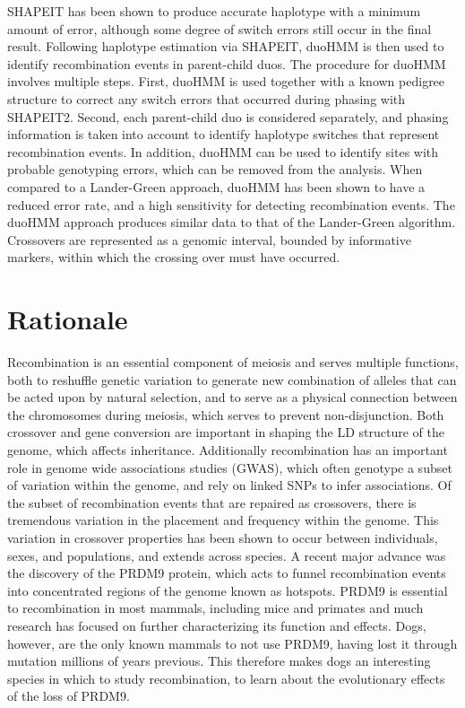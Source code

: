 SHAPEIT has been shown to produce accurate haplotype with a minimum amount of error, although some degree of switch errors still occur in the final result.
Following haplotype estimation via SHAPEIT, duoHMM\cite{OConnell2014} is then used to identify recombination events in parent-child duos.
The procedure for duoHMM involves multiple steps.
First, duoHMM is used together with a known pedigree structure to correct any switch errors that occurred during phasing with SHAPEIT2.
Second, each parent-child duo is considered separately, and phasing information is taken into account to identify haplotype switches that represent recombination events.
In addition, duoHMM can be used to identify sites with probable genotyping errors, which can be removed from the analysis.
When compared to a Lander-Green approach, duoHMM has been shown to have a reduced error rate, and a high sensitivity for detecting recombination events\cite{OConnell2014}.
The duoHMM approach produces similar data to that of the Lander-Green algorithm.
Crossovers are represented as a genomic interval, bounded by informative markers, within which the crossing over must have occurred.





\section{Rationale}

Recombination is an essential component of meiosis and serves multiple functions, both to reshuffle genetic variation to generate new combination of alleles that can be acted upon by natural selection, and to serve as a physical connection between the chromosomes during meiosis, which serves to prevent non-disjunction.
Both crossover and gene conversion are important in shaping the LD structure of the genome, which affects inheritance.
Additionally recombination has an important role in genome wide associations studies (GWAS), which often genotype a subset of variation within the genome, and rely on linked SNPs to infer associations.
Of the subset of recombination events that are repaired as crossovers, there is tremendous variation in the placement and frequency within the genome.
This variation in crossover properties has been shown to occur between individuals, sexes, and populations, and extends across species.
A recent major advance was the discovery of the PRDM9 protein, which acts to funnel recombination events into concentrated regions of the genome known as hotspots.
PRDM9 is essential to recombination in most mammals, including mice and primates and much research has focused on further characterizing its function and effects.
Dogs, however, are the only known mammals to not use PRDM9, having lost it through mutation millions of years previous.
This therefore makes dogs an interesting species in which to study recombination, to learn about the evolutionary effects of the loss of PRDM9.

